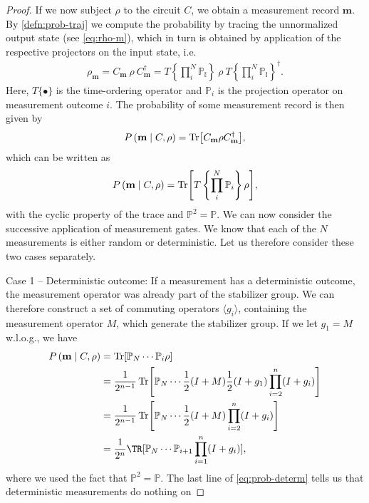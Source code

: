 \begin{proof}
If we now subject $\rho$ to the circuit $C$, we obtain a measurement record
$\mathbf{m}$. By \cref{defn:prob-traj} we compute the probability by tracing the
unnormalized output state (see \cref{eq:rho-m}), which in turn is obtained by application
of the respective projectors on the input state, i.e.
\begin{align}
  \rho_\mathbf{m} = C_\mathbf{m}\ \rho \ C_\mathbf{m}^\dagger 
  = T\left\{\prod_i^N\mathbb{P_i}\right\}\ \rho \ T\left\{\prod_i^N\mathbb{P_i}\right\}^\dagger 
.\end{align}
Here, $T\{\bullet\}$ is the time-ordering operator and $\mathbb{P}_i$ is the
projection operator on measurement outcome $i$. The probability of some
measurement record is then given by
\begin{align}
  P\left(\mathbf{m} \mid C, \rho\right) = \Tr[C_\mathbf{m} \rho
  C_\mathbf{m}^\dagger]
,\end{align}
which can be written as
\begin{align}
  P\left(\mathbf{m} \mid C, \rho\right) = \Tr[T\left\{\prod_i^N
  \mathbb{P}_i\right\}\rho]
,\end{align}
with the cyclic property of the trace and $\mathbb{P}^2 = \mathbb{P}$.
We can now consider the successive application of measurement gates.
We know that each of the $N$ measurements is either random or deterministic.
Let us therefore consider these two cases separately.
\par{Case 1 -- Deterministic outcome:}
If a measurement has a deterministic outcome, the measurement operator was
already part of the stabilizer group. We can therefore construct a set of
commuting operators $\langle g_i\rangle$, containing the measurement operator
$M$, which generate the
stabilizer group. If we let $g_1=M$ w.l.o.g., we have
\begin{align}
  P\left(\mathbf{m} \mid C, \rho\right) 
  &= \Tr[ \mathbb{P}_N \cdots \mathbb{P}_i \rho ] \nonumber\\
  &= \frac{1}{2^{n-1}}\Tr[\mathbb{P}_N \cdots \frac{1}{2} (I + M)\frac{1}{2} (I + g_1)
  \prod_{i=2}^n (I + g_i)] \nonumber\\
  &= \frac{1}{2^{n-1}}\Tr[\mathbb{P}_N\cdots \frac{1}{2}(I+M) \prod_{i=2}^n (I+g_i)] \nonumber\\
  &= \frac{1}{2^n}\TR[\mathbb{P}_N\cdots \mathbb{P}_{i+1} \prod_{i=1}^n
  (I+g_i)] \label{eq:prob-determ}
,\end{align}
where we used the fact that $\mathbb{P}^2 =\mathbb{P}$. The last line of
\cref{eq:prob-determ} tells us that deterministic measurements do nothing on

\end{proof}
